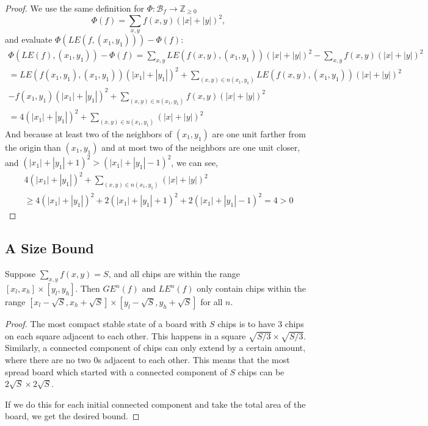\documentclass[runningheads,a4paper]{llncs}
\begin{document}
\begin{proof}
We use the same definition for $\Phi: \mathcal{B}_f \rightarrow \mathbb{Z}_{\geq 0}$ 
\[ \Phi(f) = \sum_{x,y} f(x,y)(|x|+|y|)^2, \]
and evaluate $\Phi(LE(f, (x_1,y_1))) - \Phi(f)$:
\begin{align}
\Phi(LE(f), (x_1, y_1)) - \Phi(f) =\sum_{x,y} LE(f(x,y), (x_1, y_1))(|x|+|y|)^2 - \sum_{x,y} f(x,y)(|x|+|y|)^2 \\
= LE(f(x_1,y_1), (x_1, y_1))(|x_1|+|y_1|)^2 + \sum_{(x,y) \in n(x_1,y_1)} LE(f(x,y), (x_1, y_1))(|x|+|y|)^2 \\- f(x_1,y_1)(|x_1|+|y_1|)^2 + \sum_{(x,y) \in n(x_1, y_1)} f(x,y)(|x|+|y|)^2 \\
= 4(|x_1| + |y_1|)^2 +\sum_{(x,y) \in n(x_1, y_1)} (|x| + |y|)^2
\end{align}
And because at least two of the neighbors of $(x_1, y_1)$ are one unit farther from the origin than $(x_1, y_1)$ and at most two of the neighbors are one unit closer, and $(|x_1|+|y_1| +1)^2 > (|x_1|+|y_1| - 1)^2$, we can see,
\begin{align}
4(|x_1| + |y_1|)^2 +\sum_{(x,y) \in n(x_1, y_1)} (|x| + |y|)^2  \\ 
\geq 4(|x_1| + |y_1|)^2 + 2 (|x_1| + |y_1|+1)^2 + 2 (|x_1| + |y_1|-1)^2 = 4 >0
\end{align}
\end{proof}

\subsection{A Size Bound}
\begin{lemma}
\label{finiteextension}
Suppose $\sum_{x,y} f(x,y) = S$, and all chips are within the range $[x_l, x_h] \times [y_l, y_h]$. Then $GE^n(f)$ and $LE^n(f)$ only contain chips within the range $[x_l - \sqrt{S}, x_h + \sqrt{S}] \times [y_l-\sqrt{S}, y_h+\sqrt{S}]$ for all $n$.
\end{lemma}

\begin{proof}
The most compact stable state of a board with $S$ chips is to have $3$ chips on each square adjacent to each other. This happens in a square $\sqrt{S/3} \times \sqrt{S/3}$. Similarly, a connected component of chips can only extend by a certain amount, where there are no two 0s adjacent to each other. This means that the most spread board which started with a connected component of $S$ chips can be $2\sqrt{S} \times 2\sqrt{S}$. 

If we do this for each initial connected component and take the total area of the board, we get the desired bound.
\end{proof}
\end{document}
